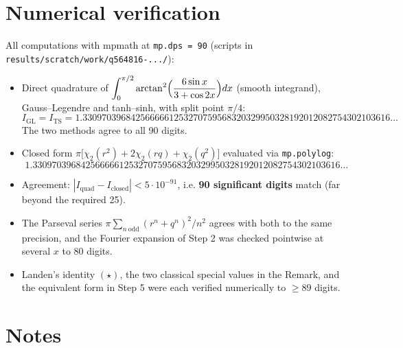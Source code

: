 \documentclass[11pt]{article}
\theoremstyle{remark}
\begin{document}
\section*{Numerical verification}

All computations with mpmath at \texttt{mp.dps = 90} (scripts in \texttt{results/scratch/work/q564816-.../}):

\begin{itemize}
\item Direct quadrature of $\displaystyle\int_0^{\pi/2}\arctan^2\Bigl(\frac{6\sin x}{3+\cos2x}\Bigr)dx$ (smooth integrand), Gauss--Legendre and tanh--sinh, with split point $\pi/4$:
  \[
  I_{\mathrm{GL}}=I_{\mathrm{TS}}=1.3309703968425666661253270759568320329950328192012082754302103616\ldots
  \]
  The two methods agree to all 90 digits.
\item Closed form $\pi\bigl[\chi_2(r^2)+2\chi_2(rq)+\chi_2(q^2)\bigr]$ evaluated via \texttt{mp.polylog}:
  \[
  1.3309703968425666661253270759568320329950328192012082754302103616\ldots
  \]
\item Agreement: $|I_{\mathrm{quad}}-I_{\mathrm{closed}}|<5\cdot10^{-91}$, i.e. \textbf{90 significant digits} match (far beyond the required 25).
\item The Parseval series $\pi\sum_{n\ \mathrm{odd}}(r^n+q^n)^2/n^2$ agrees with both to the same precision, and the Fourier expansion of Step 2 was checked pointwise at several $x$ to $80$ digits.
\item Landen's identity $(\star)$, the two classical special values in the Remark, and the equivalent form in Step 5 were each verified numerically to $\ge89$ digits.
\end{itemize}

\section*{Notes}
\end{document}
